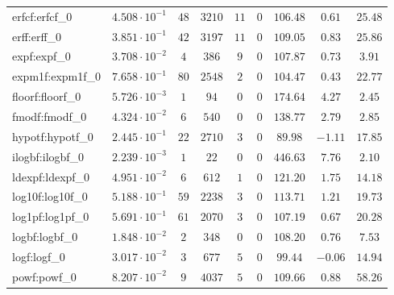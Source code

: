 \begin{tabular}{|l|c|c|c|c|c|c|c|c|}
erfcf:erfcf\_0               & $ 4.508 \cdot 10^{-1} $ & $ 48     $ & $ 3210  $ & $ 11  $ & $ 0   $ & $ 106.48      $ & $ 0.61    $ & $ 25.48   $ \\
erff:erff\_0                 & $ 3.851 \cdot 10^{-1} $ & $ 42     $ & $ 3197  $ & $ 11  $ & $ 0   $ & $ 109.05      $ & $ 0.83    $ & $ 25.86   $ \\
expf:expf\_0                 & $ 3.708 \cdot 10^{-2} $ & $ 4      $ & $ 386   $ & $ 9   $ & $ 0   $ & $ 107.87      $ & $ 0.73    $ & $ 3.91    $ \\
expm1f:expm1f\_0             & $ 7.658 \cdot 10^{-1} $ & $ 80     $ & $ 2548  $ & $ 2   $ & $ 0   $ & $ 104.47      $ & $ 0.43    $ & $ 22.77   $ \\
floorf:floorf\_0             & $ 5.726 \cdot 10^{-3} $ & $ 1      $ & $ 94    $ & $ 0   $ & $ 0   $ & $ 174.64      $ & $ 4.27    $ & $ 2.45    $ \\
fmodf:fmodf\_0               & $ 4.324 \cdot 10^{-2} $ & $ 6      $ & $ 540   $ & $ 0   $ & $ 0   $ & $ 138.77      $ & $ 2.79    $ & $ 2.85    $ \\
hypotf:hypotf\_0             & $ 2.445 \cdot 10^{-1} $ & $ 22     $ & $ 2710  $ & $ 3   $ & $ 0   $ & $ 89.98       $ & $ -1.11   $ & $ 17.85   $ \\
ilogbf:ilogbf\_0             & $ 2.239 \cdot 10^{-3} $ & $ 1      $ & $ 22    $ & $ 0   $ & $ 0   $ & $ 446.63      $ & $ 7.76    $ & $ 2.10    $ \\
ldexpf:ldexpf\_0             & $ 4.951 \cdot 10^{-2} $ & $ 6      $ & $ 612   $ & $ 1   $ & $ 0   $ & $ 121.20      $ & $ 1.75    $ & $ 14.18   $ \\
log10f:log10f\_0             & $ 5.188 \cdot 10^{-1} $ & $ 59     $ & $ 2238  $ & $ 3   $ & $ 0   $ & $ 113.71      $ & $ 1.21    $ & $ 19.73   $ \\
log1pf:log1pf\_0             & $ 5.691 \cdot 10^{-1} $ & $ 61     $ & $ 2070  $ & $ 3   $ & $ 0   $ & $ 107.19      $ & $ 0.67    $ & $ 20.28   $ \\
logbf:logbf\_0               & $ 1.848 \cdot 10^{-2} $ & $ 2      $ & $ 348   $ & $ 0   $ & $ 0   $ & $ 108.20      $ & $ 0.76    $ & $ 7.53    $ \\
logf:logf\_0                 & $ 3.017 \cdot 10^{-2} $ & $ 3      $ & $ 677   $ & $ 5   $ & $ 0   $ & $ 99.44       $ & $ -0.06   $ & $ 14.94   $ \\
powf:powf\_0                 & $ 8.207 \cdot 10^{-2} $ & $ 9      $ & $ 4037  $ & $ 5   $ & $ 0   $ & $ 109.66      $ & $ 0.88    $ & $ 58.26   $ \\

\end{tabular}
